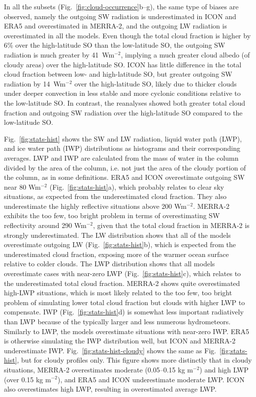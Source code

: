 \documentclass[draft]{agujournal2019}
\begin{document}
In all the subsets (Fig.~\ref{fig:cloud-occurrence}b--g), the same type of biases are observed, namely the outgoing SW radiation is underestimated in ICON and ERA5 and overestimated in MERRA-2, and the outgoing LW radiation is overestimated in all the models. Even though the total cloud fraction is higher by 6\% over the high-latitude SO than the low-latitude SO, the outgoing SW radiation is much greater by 41~Wm$^{-2}$, implying a much greater cloud albedo (of cloudy areas) over the high-latitude SO. ICON has little difference in the total cloud fraction between low- and high-latitude SO, but greater outgoing SW radiation by 14~Wm$^{-2}$ over the high-latitude SO, likely due to thicker clouds under deeper convection in less stable and more cyclonic conditions relative to the low-latitude SO. In contrast, the reanalyses showed both greater total cloud fraction and outgoing SW radiation over the high-latitude SO compared to the low-latitude SO.

Fig.~\ref{fig:stats-hist} shows the SW and LW radiation, liquid water path (LWP), and ice water path (IWP) distributions as histograms and their corresponding averages. LWP and IWP are calculated from the mass of water in the column divided by the area of the column, i.e. not just the area of the cloudy portion of the column, as in some definitions. ERA5 and ICON overestimate outgoing SW near 80 Wm$^{-2}$ (Fig.~\ref{fig:stats-hist}a), which probably relates to clear sky situations, as expected from the underestimated cloud fraction. They also underestimate the highly reflective situations above 200 Wm$^{-2}$. MERRA-2 exhibits the too few, too bright problem in terms of overestimating SW reflectivity around 290 Wm$^{-2}$, given that the total cloud fraction in MERRA-2 is strongly underestimated. The LW distribution shows that all of the models overestimate outgoing LW (Fig.~\ref{fig:stats-hist}b), which is expected from the underestimated cloud fraction, exposing more of the warmer ocean surface relative to colder clouds. The LWP distribution shows that all models overestimate cases with near-zero LWP (Fig.~\ref{fig:stats-hist}c), which relates to the underestimated total cloud fraction. MERRA-2 shows quite overestimated high-LWP situations, which is most likely related to the too few, too bright problem of simulating lower total cloud fraction but clouds with higher LWP to compensate. IWP (Fig.~\ref{fig:stats-hist}d) is somewhat less important radiatively than LWP because of the typically larger and less numerous hydrometeors. Similarly to LWP, the models overestimate situations with near-zero IWP. ERA5 is otherwise simulating the IWP distribution well, but ICON and MERRA-2 underestimate IWP. Fig.~\ref{fig:stats-hist-cloudy} shows the same as Fig.~\ref{fig:stats-hist}, but for cloudy profiles only. This figure shows more distinctly that in cloudy situations, MERRA-2 overestimates moderate (0.05--0.15 kg m$^{-2}$) and high LWP (over 0.15 kg m$^{-2}$), and ERA5 and ICON underestimate moderate LWP. ICON also overestimates high LWP, resulting in overestimated average LWP.
\end{document}
